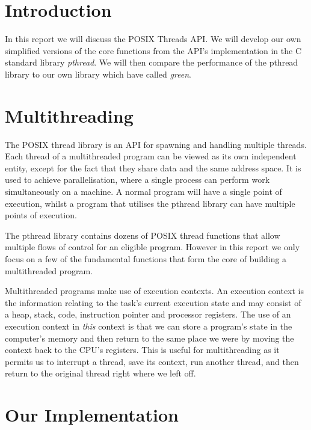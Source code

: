 \documentclass[11pt]{article}
\begin{document}
\maketitle

\pagebreak
\section{Introduction}
In this report we will discuss the POSIX Threads API. We will develop our own simplified versions of the core functions from the API's implementation in the C standard library \textit{pthread}. We will then compare the performance of the pthread library to our own library which have called \textit{green}. 

\section{Multithreading}\label{Multithreading}

The POSIX thread library is an API for spawning and handling multiple threads. Each thread of a multithreaded program can be viewed as its own independent entity, except for the fact that they share data and the same address space. It is used to achieve parallelisation, where a single process can perform work simultaneously on a machine. A normal program will have a single point of execution, whilst a program that utilises the pthread library can have multiple points of execution. 

The pthread library contains dozens of POSIX thread functions that allow multiple flows of control for an eligible program. However in this report we only focus on a few of the fundamental functions that form the core of building a multithreaded program.

Multithreaded programs make use of execution contexts. An execution context is the information relating to the task's current execution state and may consist of a heap, stack, code, instruction pointer and processor registers. The use of an execution context in \textit{this} context is that we can store a program's state in the computer's memory and then return to the same place we were by moving the context back to the CPU's registers. This is useful for multithreading as it permits us to interrupt a thread, save its context, run another thread, and then return to the original thread right where we left off.

\section{Our Implementation}
\end{document}
